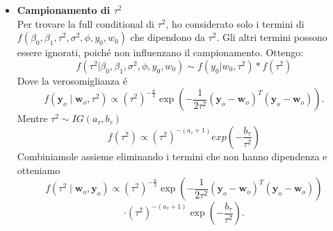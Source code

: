 \documentclass[a4paper,12pt]{article}
\begin{document}
\begin{itemize}
\begin{itemize}
			\item \textbf{Campionamento di $\tau^2$}\\
			Per trovare la full conditional di \( \tau^2 \), ho considerato solo i termini di \( f(\beta_0,\beta_1,\tau^2,\sigma^2,\phi , y_0,w_0) \) che dipendono da \( \tau^2 \). Gli altri termini possono essere ignorati, poiché non influenzano il campionamento. Ottengo:
			\[
			f(\tau^2|\beta_0,\beta_1,\sigma^2,\phi , y_0,w_0) \sim f(y_0 | w_0,\tau^2)*f(\tau^2)
			\]
			Dove la verosomiglianza é
			\[
			f(\mathbf{y}_o \mid \mathbf{w}_o, \tau^2) \propto (\tau^2)^{-\frac{n}{2}} 
			\exp \left( -\frac{1}{2 \tau^2} (\mathbf{y}_o - \mathbf{w}_o)^T (\mathbf{y}_o - \mathbf{w}_o) \right).
			\]
			Mentre $\tau^2 \sim IG(a_{\tau},b_{\tau})$
			\[
			f(\tau^2) \propto (\tau^2)^{-(a_{\tau}+1)} exp(-\frac{b_{\tau}}{\tau^2})
			\]
			Combiniamole assieme eliminando i termini che non hanno dipendenza e otteniamo
			\[
			f(\tau^2 \mid \mathbf{w}_o, \mathbf{y}_o) \propto (\tau^2)^{-\frac{n}{2}} 
			\exp \left( -\frac{1}{2 \tau^2} (\mathbf{y}_o - \mathbf{w}_o)^T (\mathbf{y}_o - \mathbf{w}_o) \right)
			\]
			\[
			\cdot (\tau^2)^{-(a_\tau + 1)} \exp \left( -\frac{b_\tau}{\tau^2} \right).
			\]
			

\end{itemize}
\end{itemize}
\end{document}
